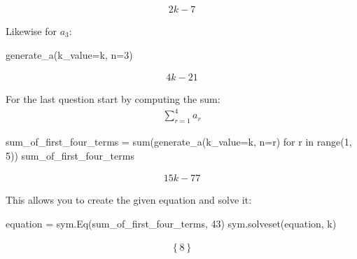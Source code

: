 \begin{equation*}
\begin{split}\displaystyle 2 k - 7\end{split}
\end{equation*}




Likewise for \(a_3\):




\begin{pyin}
generate_a(k_value=k, n=3)
\end{pyin}




\begin{equation*}
\begin{split}\displaystyle 4 k - 21\end{split}
\end{equation*}




For the last question start by computing the sum:
\begin{equation*}
\begin{split}
    \sum_{r=1}^4 a_r
\end{split}
\end{equation*}



\begin{pyin}
sum_of_first_four_terms = sum(generate_a(k_value=k, n=r) for r in range(1, 5))
sum_of_first_four_terms
\end{pyin}




\begin{equation*}
\begin{split}\displaystyle 15 k - 77\end{split}
\end{equation*}




This allows you to create the given equation and solve it:




\begin{pyin}
equation = sym.Eq(sum_of_first_four_terms, 43)
sym.solveset(equation, k)
\end{pyin}




\begin{equation*}
\begin{split}\displaystyle \left\{8\right\}\end{split}
\end{equation*}





